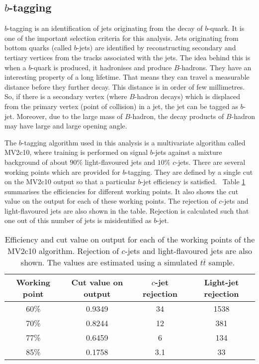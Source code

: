 \subsection{$b$-tagging}%
\label{sec:analysisstrategy:physicsobjets:bjets}
$b$-tagging is an identification of jets originating from the decay of $b$-quark. It is one of the important selection criteria for this analysis. Jets originating from bottom quarks (called $b$-jets) are identified by reconstructing secondary and tertiary vertices from the tracks associated with the jets. The idea behind this is when a $b$-quark is produced, it hadronises and produce $B$-hadrons. They have an interesting property of a long lifetime. That means they can travel a measurable distance before they further decay. This distance is in order of few millimetres. So, if there is a secondary vertex (where $B$-hadron decays) which is displaced from the primary vertex (point of collision) in a jet, the jet can be tagged as $b$-jet. Moreover, due to the large mass of $B$-hadron, the decay products of $B$-hadron may have large \pt and large opening angle.~\cite{thomson}

The $b$-tagging algorithm used in this analysis is a multivariate algorithm called MV2c10, where training is performed on signal $b$-jets against a mixture background of about $90\%$ light-flavoured jets and $10\%$ $c$-jets. There are several working points which are provided for $b$-tagging. They are defined by a single cut on the MV2c10 output so that a particular $b$-jet efficiency is satisfied.~\cite{thesis:rui} Table \ref{table:analysisstrategy:physicsobjets:bjets} summarises the efficiencies for different working points. It also shows the cut value on the output for each of these working points. The rejection of $c$-jets and light-flavoured jets are also shown in the table. Rejection is calculated such that one out of this number of jets is misidentified as $b$-jet. 

\begin{table}[hbt!]
	\centering
	\begin{tabular}{c | c | c | c} 
		\toprule
		Working point & Cut value on output & $c$-jet rejection & Light-jet rejection \\
		\midrule
		60\% & 0.9349 & \num{34} & \num{1538} \\
		70\% & 0.8244 & \num{12} & \num{381} \\
		77\% & 0.6459 & \num{6} & \num{134} \\
		85\% & 0.1758 & \num{3.1} & \num{33} \\
		\bottomrule
	\end{tabular}
	\caption{Efficiency and cut value on output for each of the working points of the MV2c10 algorithm. Rejection of $c$-jets and light-flavoured jets are also shown. The values are estimated using a simulated $t\bar{t}$ sample.~\cite{thesis:rui}}
	\label{table:analysisstrategy:physicsobjets:bjets}
\end{table}


